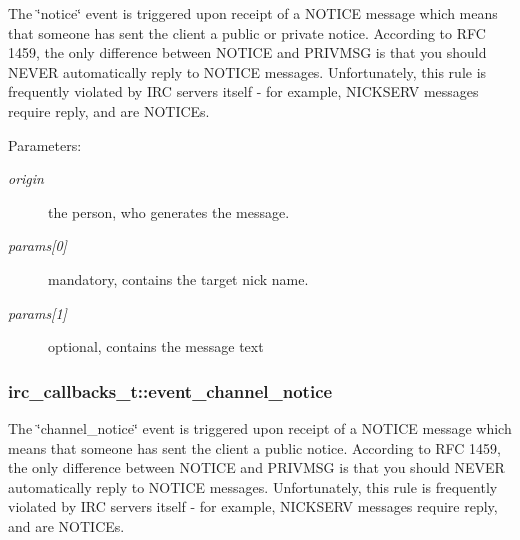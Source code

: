 The \char`\"{}notice\char`\"{} event is triggered upon receipt of a NOTICE message which means that someone has sent the client a public or private notice. According to RFC 1459, the only difference between NOTICE and PRIVMSG is that you should NEVER automatically reply to NOTICE messages. Unfortunately, this rule is frequently violated by IRC servers itself - for example, NICKSERV messages require reply, and are NOTICEs.

\begin{Desc}
\item[Parameters:]
\begin{description}
\item[{\em origin}]the person, who generates the message. \item[{\em params\mbox{[}0\mbox{]}}]mandatory, contains the target nick name. \item[{\em params\mbox{[}1\mbox{]}}]optional, contains the message text \end{description}
\end{Desc}
\hypertarget{structirc__callbacks__t_ce284026a0e082bcdc13a6dae26dd90b}{
\subsubsection[event\_\-channel\_\-notice]{ {\bf irc\_\-callbacks\_\-t::event\_\-channel\_\-notice}}}
\label{structirc__callbacks__t_ce284026a0e082bcdc13a6dae26dd90b}


The \char`\"{}channel\_\-notice\char`\"{} event is triggered upon receipt of a NOTICE message which means that someone has sent the client a public notice. According to RFC 1459, the only difference between NOTICE and PRIVMSG is that you should NEVER automatically reply to NOTICE messages. Unfortunately, this rule is frequently violated by IRC servers itself - for example, NICKSERV messages require reply, and are NOTICEs.

